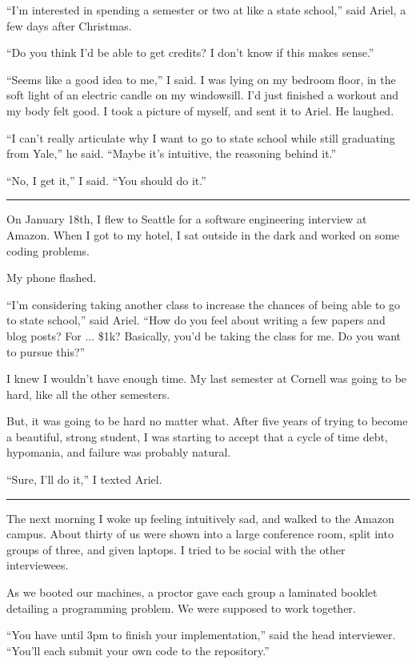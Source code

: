 ``I'm interested in spending a semester or two at like a state school,'' said
Ariel, a few days after Christmas.

``Do you think I'd be able to get credits?  I don't know if this makes sense.''

``Seems like a good idea to me,'' I said.  I was lying on my bedroom floor, in
the soft light of an electric candle on my windowsill.  I'd just finished a
workout and my body felt good.  I took a picture of myself, and sent it to
Ariel.  He laughed.

``I can't really articulate why I want to go to state school while still
graduating from Yale,'' he said. ``Maybe it's intuitive, the reasoning behind
it.''

``No, I get it,'' I said. ``You should do it.''

\plainfancybreak{12pt}{2}{}

On January 18th, I flew to Seattle for a software engineering interview at
Amazon.  When I got to my hotel, I sat outside in the dark and worked on some
coding problems.

My phone flashed.

``I'm considering taking another class to increase the chances of being able to
go to state school,'' said Ariel.  ``How do you feel about writing a few papers
and blog posts?  For ... \$1k?  Basically, you'd be taking the class for me.  Do
you want to pursue this?''

I knew I wouldn't have enough time.  My last semester at Cornell was going to be
hard, like all the other semesters.

But, it was going to be hard no matter what.  After five years of trying to
become a beautiful, strong student, I was starting to accept that a cycle of
time debt, hypomania, and failure was probably natural.

``Sure, I'll do it,'' I texted Ariel.

\plainfancybreak{12pt}{2}{}

The next morning I woke up feeling intuitively sad, and walked to the Amazon
campus.  About thirty of us were shown into a large conference room, split into
groups of three, and given laptops.  I tried to be social with the other
interviewees.

As we booted our machines, a proctor gave each group a laminated booklet
detailing a programming problem.  We were supposed to work together.

``You have until 3pm to finish your implementation,'' said the head interviewer.
``You'll each submit your own code to the repository.''

